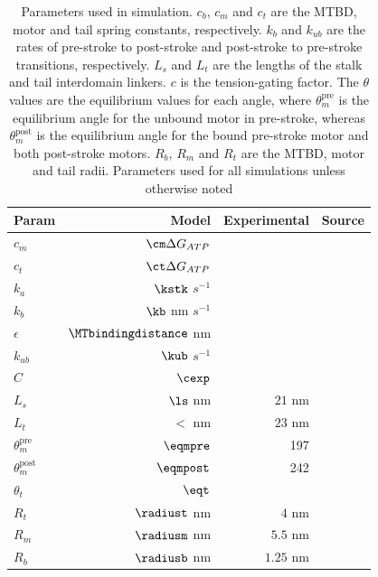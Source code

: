 \documentclass[9pt,twocolumn,twoside]{article}
\begin{document}
\begin{table}
  \centering
  \begin{tabular}{lrrr}
    Param & Model & Experimental & Source \\
    \hline
    $c_m$ & $\cm \Delta G_{ATP}$ &  & \\
    $c_t$ & $\ct \Delta G_{ATP}$ &  & \\
    $k_a$ & $\kstk$  $s^{-1}$ &  & \\
    $k_b$ & $\kb$  nm $s^{-1}$ &  & \\
    $\epsilon$ &  $\MTbindingdistance$ nm & & \\
    $k_{ub}$ & $\kub$ $s^{-1}$ & & \\
    $C$ & $\cexp$ & & \\
    $L_s$ & $\ls$ nm & $21$ nm & \cite{Burgess2003, 3vkh-cite, carter-paper}\\
    $L_t$ & $\lt$ nm & $23$ nm & \cite{Burgess2003, 3vkh-cite, carter-paper}\\
    $\theta_m^{\mbox{pre}}$ & $\eqmpre$ &  197 & \cite{Burgess2003}\\
    $\theta_m^{\mbox{post}}$ & $\eqmpost$ & 242 & \cite{Burgess2003}\\
    $\theta_t$ & $\eqt$ &  & \\
    $R_t$ & $\radiust$ nm & $4$ nm & \cite{Burgess2003}\\
    $R_m$ & $\radiusm$ nm & $5.5$ nm & \cite{Burgess2003}\\
    $R_b$ & $\radiusb$ nm & $1.25$ nm & \cite{Burgess2003}\\
    \hline
  \end{tabular}
  \caption{Parameters used in simulation. $c_b$, $c_m$ and $c_t$ are the MTBD, motor and tail spring constants, respectively. $k_b$ and $k_{ub}$ are the rates of pre-stroke to post-stroke and post-stroke to pre-stroke transitions, respectively. $L_s$ and $L_t$ are the lengths of the stalk and tail interdomain linkers. $c$ is the tension-gating factor. The $\theta$ values are the equilibrium values for each angle, where $\theta_m^{\mbox{pre}}$ is the equilibrium angle for the unbound motor in pre-stroke, whereas $\theta_m^{\mbox{post}}$ is the equilibrium angle for the bound pre-stroke motor and both post-stroke motors. $R_b$, $R_m$ and $R_t$ are the MTBD, motor and tail radii. Parameters used for all simulations unless otherwise noted}
  \label{table:params}
\end{table}
\end{document}
